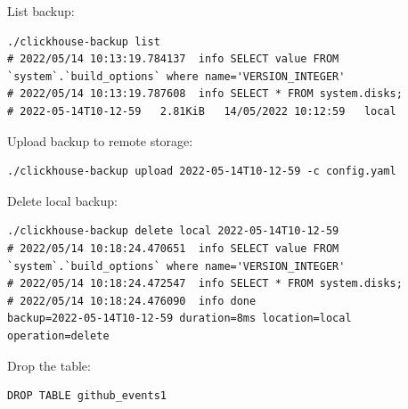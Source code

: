 List backup:
\begin{verbatim}
./clickhouse-backup list
# 2022/05/14 10:13:19.784137  info SELECT value FROM `system`.`build_options` where name='VERSION_INTEGER'
# 2022/05/14 10:13:19.787608  info SELECT * FROM system.disks;
# 2022-05-14T10-12-59   2.81KiB   14/05/2022 10:12:59   local
\end{verbatim}

Upload backup to remote storage:
\begin{verbatim}
./clickhouse-backup upload 2022-05-14T10-12-59 -c config.yaml
\end{verbatim}

Delete local backup:
\begin{verbatim}
./clickhouse-backup delete local 2022-05-14T10-12-59
# 2022/05/14 10:18:24.470651  info SELECT value FROM `system`.`build_options` where name='VERSION_INTEGER'
# 2022/05/14 10:18:24.472547  info SELECT * FROM system.disks;
# 2022/05/14 10:18:24.476090  info done                      backup=2022-05-14T10-12-59 duration=8ms location=local operation=delete
\end{verbatim}

Drop the table:
\begin{verbatim}
DROP TABLE github_events1
\end{verbatim}

